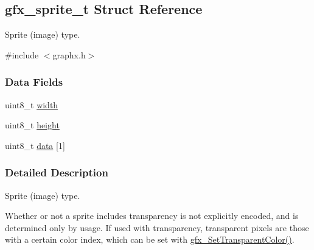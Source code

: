 \hypertarget{structgfx__sprite__t}{}\subsection{gfx\+\_\+sprite\+\_\+t Struct Reference}
\label{structgfx__sprite__t}


Sprite (image) type.  




{\ttfamily \#include $<$graphx.\+h$>$}

\subsubsection*{Data Fields}
\begin{DoxyCompactItemize}
\item 
uint8\+\_\+t \hyperlink{structgfx__sprite__t_a5c2835a8d10b855c322330edcedb96a9}{width}
\item 
uint8\+\_\+t \hyperlink{structgfx__sprite__t_a25b687d1d45d86e9ae29318f8f135cf4}{height}
\item 
uint8\+\_\+t \hyperlink{structgfx__sprite__t_afbaeef67c679b34129dd80814c77705a}{data} \mbox{[}1\mbox{]}
\end{DoxyCompactItemize}


\subsubsection{Detailed Description}
Sprite (image) type. 

Whether or not a sprite includes transparency is not explicitly encoded, and is determined only by usage. If used with transparency, transparent pixels are those with a certain color index, which can be set with \hyperlink{graphx_8h_a2de6c559177f25c8b469cef81b96de42}{gfx\+\_\+\+Set\+Transparent\+Color()}.

